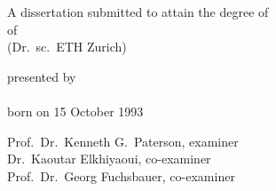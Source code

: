 \begin{titlepage}
    \begin{center}
        \large
        \begingroup
        \endgroup

        \hfill

        \vfill

        \begingroup
            \spacedallcaps{\myTitle}
        \endgroup

        \vfill

        \begingroup
            A dissertation submitted to attain the degree of\\
            \vspace{0.5em}
            of
             \\
            (Dr.\ sc.\ ETH Zurich)
        \endgroup

        \vfill

        \begingroup
            presented by\\
            \vspace{0.5em}
            \spacedlowsmallcaps{\myName}\\
            \vspace{0.5em}
            born on 15 October 1993
        \endgroup

        \vfill

        \begingroup
            \vspace{0.5em}
            Prof.\ Dr.\ Kenneth G.\ Paterson, examiner\\
            Dr.\ Kaoutar Elkhiyaoui, co-examiner\\
            Prof.\ Dr.\ Georg Fuchsbauer, co-examiner
        \endgroup

        \vfill

        \myTime%

        \vfill
    \end{center}
\end{titlepage}
